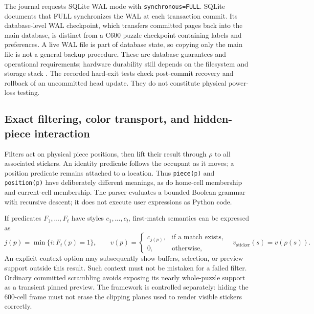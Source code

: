 \documentclass[a4paper,11pt]{article}
\begin{document}
The journal requests SQLite WAL mode with \texttt{synchronous=FULL}. SQLite documents that FULL synchronizes the WAL at each transaction commit. Its database-level WAL checkpoint, which transfers committed pages back into the main database, is distinct from a C600 puzzle checkpoint containing labels and preferences. A live WAL file is part of database state, so copying only the main file is not a general backup procedure. These are database guarantees and operational requirements; hardware durability still depends on the filesystem and storage stack \cite{sqlitewal,sqliteatomic}. The recorded hard-exit tests check post-commit recovery and rollback of an uncommitted head update. They do not constitute physical power-loss testing.

\subsection{Exact filtering, color transport, and hidden-piece interaction}

Filters act on physical piece positions, then lift their result through \(\rho\) to all associated stickers. An identity predicate follows the occupant as it moves; a position predicate remains attached to a location. Thus \texttt{piece(p)} and \texttt{position(p)} have deliberately different meanings, as do home-cell membership and current-cell membership. The parser evaluates a bounded Boolean grammar with recursive descent; it does not execute user expressions as Python code.

If predicates \(F_1,\ldots,F_t\) have styles \(c_1,\ldots,c_t\), first-match semantics can be expressed as
\begin{equation}
j(p)=\min\{i:F_i(p)=1\},\qquad
v(p)=\begin{cases}c_{j(p)},&\text{if a match exists},\\0,&\text{otherwise},\end{cases}
\quad v_{\mathrm{sticker}}(s)=v(\rho(s)).
\label{eq:filter-policy}
\end{equation}
An explicit context option may subsequently show buffers, selection, or preview support outside this result. Such context must not be mistaken for a failed filter. Ordinary committed scrambling avoids exposing its nearly whole-puzzle support as a transient pinned preview. The framework is controlled separately: hiding the 600-cell frame must not erase the clipping planes used to render visible stickers correctly.
\end{document}
